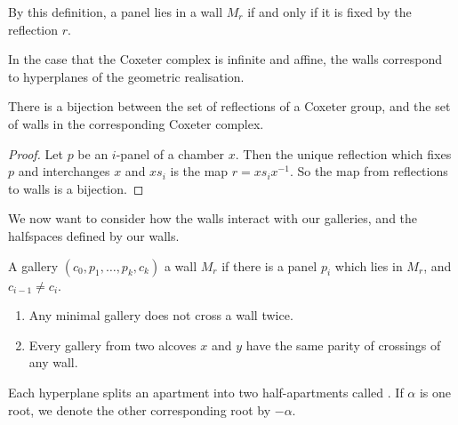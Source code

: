 \documentclass[11pt]{article}
\begin{document}
By this definition, a panel lies in a wall $M_r$ if and only if it is fixed by the reflection $r$. 

\begin{example}
    In the case that the Coxeter complex is infinite and affine, the walls correspond to hyperplanes of the geometric realisation. 
\end{example}

\begin{theorem}
    There is a bijection between the set of reflections of a Coxeter group, and the set of walls in the corresponding Coxeter complex.
\end{theorem}

\begin{proof}
    Let $p$ be an $i$-panel of a chamber $x$. Then the unique reflection which fixes $p$ and interchanges $x$ and $xs_i$ is the map $r=xs_ix^{-1}$. So the map from reflections to walls is a bijection.
\end{proof}




We now want to consider how the walls interact with our galleries, and the halfspaces defined by our walls.

\begin{definition}
    A gallery $(c_0,p_1,\hdots ,p_k,c_k)$  a wall $M_r$ if there is a panel $p_i$ which lies in $M_r$, and $c_{i-1}\neq c_i$. 
\end{definition}

\begin{lemma}
    \begin{enumerate}
        \item Any minimal gallery does not cross a wall twice.
        \item Every gallery from two alcoves $x$ and $y$ have the same parity of crossings of any wall.
    \end{enumerate}
\end{lemma}


\begin{definition}
    Each hyperplane splits an apartment into two half-apartments called . If $\alpha$ is one root, we denote the other corresponding root by $-\alpha$. 
\end{definition}
\end{document}
